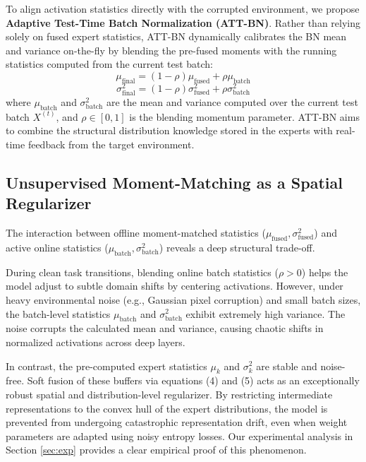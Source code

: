 \documentclass{article}
\theoremstyle{plain}
\theoremstyle{definition}
\theoremstyle{remark}
\begin{document}
To align activation statistics directly with the corrupted environment, we propose \textbf{Adaptive Test-Time Batch Normalization (ATT-BN)}. Rather than relying solely on fused expert statistics, ATT-BN dynamically calibrates the BN mean and variance on-the-fly by blending the pre-fused moments with the running statistics computed from the current test batch:
\begin{equation}
    \mu_{\text{final}} = (1-\rho) \mu_{\text{fused}} + \rho \mu_{\text{batch}}
\end{equation}
\begin{equation}
    \sigma^2_{\text{final}} = (1-\rho) \sigma^2_{\text{fused}} + \rho \sigma^2_{\text{batch}}
\end{equation}
where $\mu_{\text{batch}}$ and $\sigma^2_{\text{batch}}$ are the mean and variance computed over the current test batch $X^{(t)}$, and $\rho \in [0, 1]$ is the blending momentum parameter. ATT-BN aims to combine the structural distribution knowledge stored in the experts with real-time feedback from the target environment.

\subsection{Unsupervised Moment-Matching as a Spatial Regularizer}
The interaction between offline moment-matched statistics ($\mu_{\text{fused}}, \sigma^2_{\text{fused}}$) and active online statistics ($\mu_{\text{batch}}, \sigma^2_{\text{batch}}$) reveals a deep structural trade-off. 

During clean task transitions, blending online batch statistics ($\rho > 0$) helps the model adjust to subtle domain shifts by centering activations. However, under heavy environmental noise (e.g., Gaussian pixel corruption) and small batch sizes, the batch-level statistics $\mu_{\text{batch}}$ and $\sigma^2_{\text{batch}}$ exhibit extremely high variance. The noise corrupts the calculated mean and variance, causing chaotic shifts in normalized activations across deep layers.

In contrast, the pre-computed expert statistics $\mu_k$ and $\sigma^2_k$ are stable and noise-free. Soft fusion of these buffers via equations (4) and (5) acts as an exceptionally robust spatial and distribution-level regularizer. By restricting intermediate representations to the convex hull of the expert distributions, the model is prevented from undergoing catastrophic representation drift, even when weight parameters are adapted using noisy entropy losses. Our experimental analysis in Section \ref{sec:exp} provides a clear empirical proof of this phenomenon.
\end{document}
